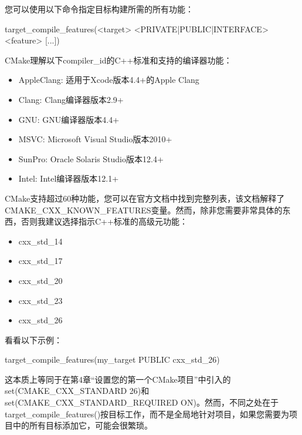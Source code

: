 您可以使用以下命令指定目标构建所需的所有功能：

\begin{shell}
target_compile_features(<target> <PRIVATE|PUBLIC|INTERFACE>
                        <feature> [...])
\end{shell}

CMake理解以下compiler\_id的C++标准和支持的编译器功能：

\begin{itemize}
\item
AppleClang: 适用于Xcode版本4.4+的Apple Clang

\item
Clang: Clang编译器版本2.9+

\item
GNU: GNU编译器版本4.4+

\item
MSVC: Microsoft Visual Studio版本2010+

\item
SunPro: Oracle Solaris Studio版本12.4+

\item
Intel: Intel编译器版本12.1+
\end{itemize}

CMake支持超过60种功能，您可以在官方文档中找到完整列表，该文档解释了CMAKE\_CXX\_KNOWN\_FEATURES变量。然而，除非您需要非常具体的东西，否则我建议选择指示C++标准的高级元功能：

\begin{itemize}
\item
cxx\_std\_14

\item
cxx\_std\_17

\item
cxx\_std\_20

\item
cxx\_std\_23

\item
cxx\_std\_26
\end{itemize}

看看以下示例：

\begin{cmake}
target_compile_features(my_target PUBLIC cxx_std_26)
\end{cmake}

这本质上等同于在第4章“设置您的第一个CMake项目”中引入的set(CMAKE\_CXX\_STANDARD 26)和set(CMAKE\_CXX\_STANDARD\_REQUIRED ON)。然而，不同之处在于target\_compile\_features()按目标工作，而不是全局地针对项目，如果您需要为项目中的所有目标添加它，可能会很繁琐。

